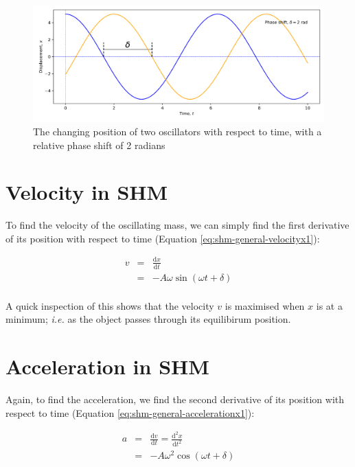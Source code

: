 \documentclass[
]{book}
\begin{document}
\begin{figure}

{\centering \includegraphics[width=0.7\linewidth]{visualisations/ch1-shmpos} 

}

\caption{The changing position of two oscillators with respect to time, with a relative phase shift of 2 radians }\label{fig:ch1-shmpos-1}
\end{figure}

\hypertarget{sec-shm-velocity}{%
\section{Velocity in SHM}\label{sec-shm-velocity}}

To find the velocity of the oscillating mass, we can simply find the first derivative of its position with respect to time (Equation \eqref{eq:shm-general-velocityx1}):

\begin{equation}
\begin{array}{rcl}
v & = & \frac{\textrm{d}x}{\textrm{d}t}\\
&=& -A \omega \sin (\omega t + \delta)\\
\end{array}
\label{eq:shm-general-velocityx1}
\end{equation}

A quick inspection of this shows that the velocity \(v\) is maximised when \(x\) is at a minimum; \emph{i.e.} as the object passes through its equilibirum position.

\hypertarget{sec-shm-acceleration}{%
\section{Acceleration in SHM}\label{sec-shm-acceleration}}

Again, to find the acceleration, we find the second derivative of its position with respect to time (Equation \eqref{eq:shm-general-accelerationx1}):

\begin{equation}
\begin{array}{rcl}
a & = & \frac{\textrm{d}v}{\textrm{d}t} = \frac{\textrm{d}^2 x}{\textrm{d}t^2}\\
&=& -A \omega^2 \cos (\omega t + \delta)\\
\end{array}
\label{eq:shm-general-accelerationx1}
\end{equation}
\end{document}
